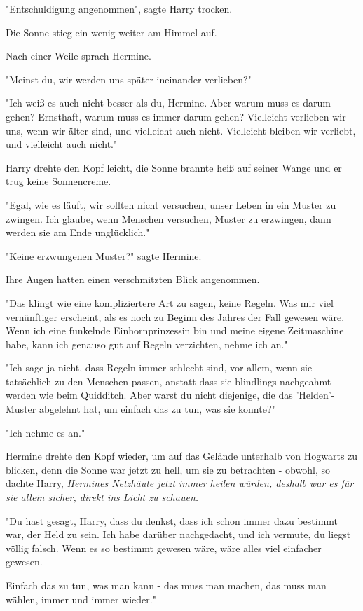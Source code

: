 {"Entschuldigung angenommen", sagte Harry trocken.

Die Sonne stieg ein wenig weiter am Himmel auf.

Nach einer Weile sprach Hermine.

"Meinst du, wir werden uns später ineinander verlieben?"

"Ich weiß es auch nicht besser als du, Hermine. Aber warum muss es darum gehen? Ernsthaft, warum muss es immer darum gehen? Vielleicht verlieben wir uns, wenn wir älter sind, und vielleicht auch nicht. Vielleicht bleiben wir verliebt, und vielleicht auch nicht."

Harry drehte den Kopf leicht, die Sonne brannte heiß auf seiner Wange und er trug keine Sonnencreme.

"Egal, wie es läuft, wir sollten nicht versuchen, unser Leben in ein Muster zu zwingen. Ich glaube, wenn Menschen versuchen, Muster zu erzwingen, dann werden sie am Ende unglücklich."

"Keine erzwungenen Muster?" sagte Hermine.

Ihre Augen hatten einen verschmitzten Blick angenommen.

"Das klingt wie eine kompliziertere Art zu sagen, keine Regeln. Was mir viel vernünftiger erscheint, als es noch zu Beginn des Jahres der Fall gewesen wäre. Wenn ich eine funkelnde Einhornprinzessin bin und meine eigene Zeitmaschine habe, kann ich genauso gut auf Regeln verzichten, nehme ich an."

"Ich sage ja nicht, dass Regeln immer schlecht sind, vor allem, wenn sie tatsächlich zu den Menschen passen, anstatt dass sie blindlings nachgeahmt werden wie beim Quidditch. Aber warst du nicht diejenige, die das 'Helden'-Muster abgelehnt hat, um einfach das zu tun, was sie konnte?"

"Ich nehme es an."

Hermine drehte den Kopf wieder, um auf das Gelände unterhalb von Hogwarts zu blicken, denn die Sonne war jetzt zu hell, um sie zu betrachten - obwohl, so dachte Harry, \emph{Hermines Netzhäute jetzt immer heilen würden, deshalb war es für sie allein sicher, direkt ins Licht zu schauen.}

"Du hast gesagt, Harry, dass du denkst, dass ich schon immer dazu bestimmt war, der Held zu sein. Ich habe darüber nachgedacht, und ich vermute, du liegst völlig falsch. Wenn es so bestimmt gewesen wäre, wäre alles viel einfacher gewesen.

Einfach das zu tun, was man kann - das muss man machen, das muss man wählen, immer und immer wieder."

}
